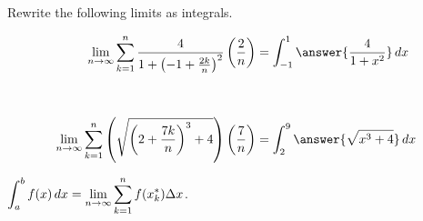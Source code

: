 \documentclass{ximera}
\author{Bobby Ramsey}
\begin{document}
\begin{exercise}
	Rewrite the following limits as integrals.

	\begin{align*}
		\lim_{n\to\infty} \sum_{k=1}^{n} \frac{4}{1+\left(-1+\frac{2k}{n}\right)^2}\left(\frac{2}{n}\right) &= \int_{-1}^{1} \answer{\frac{4}{1+x^2}} \d x\\ \\ \\
		\lim_{n\to\infty} \sum_{k=1}^{n} \left(\sqrt{\left(2+\frac{7k}{n}\right)^3+4}\right)\left(\frac{7}{n}\right) &= \int_{2}^{9} \answer{\sqrt{x^3+4}} \d x
	\end{align*}
	\begin{hint}
		$\displaystyle \int_a^b f(x) \mathop{}\!d x = \lim_{n\to\infty} \sum_{k=1}^n f(x_k^*) \Delta x$.
	\end{hint}
\end{exercise}
\end{document}
